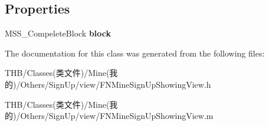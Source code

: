 \subsection*{Properties}
\begin{DoxyCompactItemize}
\item 
\mbox{\label{interface_f_n_mine_sign_up_showing_view_adeb3c97193444e8a9e853fdbb4888a7d}} 
M\+S\+S\+\_\+\+Compelete\+Block {\bfseries block}
\end{DoxyCompactItemize}


The documentation for this class was generated from the following files\+:\begin{DoxyCompactItemize}
\item 
T\+H\+B/\+Classes(类文件)/\+Mine(我的)/\+Others/\+Sign\+Up/view/F\+N\+Mine\+Sign\+Up\+Showing\+View.\+h\item 
T\+H\+B/\+Classes(类文件)/\+Mine(我的)/\+Others/\+Sign\+Up/view/F\+N\+Mine\+Sign\+Up\+Showing\+View.\+m\end{DoxyCompactItemize}
